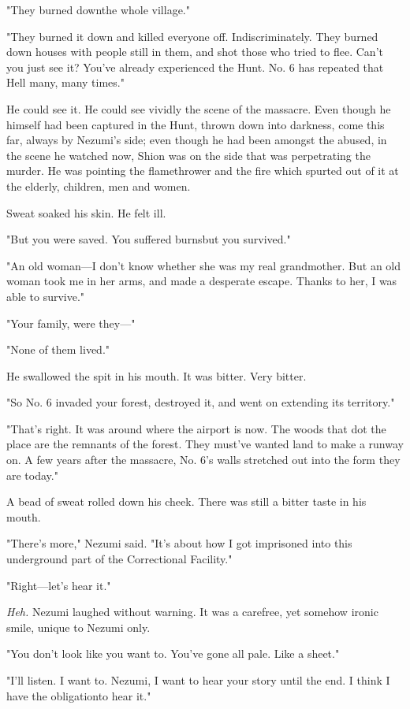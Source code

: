 "They burned down\el the whole village."

"They burned it down and killed everyone off. Indiscriminately. They
burned down houses with people still in them, and shot those who tried
to flee. Can't you just see it? You've already experienced the Hunt. No.
6 has repeated that Hell many, many times."

He could see it. He could see vividly the scene of the massacre. Even
though he himself had been captured in the Hunt, thrown down into
darkness, come this far, always by Nezumi's side; even though he had
been amongst the abused, in the scene he watched now, Shion was on the
side that was perpetrating the murder. He was pointing the flamethrower
and the fire which spurted out of it at the elderly, children, men and
women.

Sweat soaked his skin. He felt ill.

"But you were saved. You suffered burns\el but you survived."

"An old woman---I don't know whether she was my real grandmother. But an
old woman took me in her arms, and made a desperate escape. Thanks to
her, I was able to survive."

"Your family, were they---"

"None of them lived."

He swallowed the spit in his mouth. It was bitter. Very bitter.

"So No. 6 invaded your forest, destroyed it, and went on extending its
territory."

"That's right. It was around where the airport is now. The woods that
dot the place are the remnants of the forest. They must've wanted land
to make a runway on. A few years after the massacre, No. 6's walls
stretched out into the form they are today."

A bead of sweat rolled down his cheek. There was still a bitter taste in
his mouth.

"There's more," Nezumi said. "It's about how I got imprisoned into this
underground part of the Correctional Facility."

"Right---let's hear it."

\emph{Heh.} Nezumi laughed without warning. It was a carefree, yet somehow
ironic smile, unique to Nezumi only.

"You don't look like you want to. You've gone all pale. Like a sheet."

"I'll listen. I want to. Nezumi, I want to hear your story until the
end. I think I have the obligation\el to hear it."

